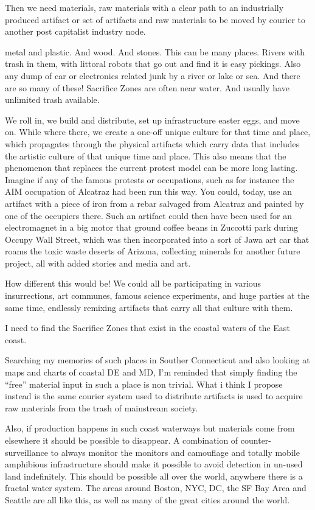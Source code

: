 Then we need materials, raw materials with a clear path to an
industrially produced artifact or set of artifacts and raw materials to
be moved by courier to another post capitalist industry node.

metal and plastic. And wood. And stones. This can be many places. Rivers
with trash in them, with littoral robots that go out and find it is easy
pickings. Also any dump of car or electronics related junk by a river or
lake or sea. And there are so many of these! Sacrifice Zones are often
near water. And usually have unlimited trash available.

We roll in, we build and distribute, set up infrastructure easter eggs,
and move on. While where there, we create a one-off unique culture for
that time and place, which propagates through the physical artifacts
which carry data that includes the artistic culture of that unique time
and place. This also means that the phenomenon that replaces the current
protest model can be more long lasting. Imagine if any of the famous
protests or occupations, such as for instance the AIM occupation of
Alcatraz had been run this way. You could, today, use an artifact with a
piece of iron from a rebar salvaged from Alcatraz and painted by one of
the occupiers there. Such an artifact could then have been used for an
electromagnet in a big motor that ground coffee beans in Zuccotti park
during Occupy Wall Street, which was then incorporated into a sort of
Jawa art car that roams the toxic waste deserts of Arizona, collecting
minerals for another future project, all with added stories and media
and art.

How different this would be! We could all be participating in various
insurrections, art communes, famous science experiments, and huge
parties at the same time, endlessly remixing artifacts that carry all
that culture with them.

I need to find the Sacrifice Zones that exist in the coastal waters of
the East coast.

Searching my memories of such places in Souther Connecticut and also
looking at maps and charts of coastal DE and MD, I'm reminded that
simply finding the ``free'' material input in such a place is non
trivial. What i think I propose instead is the same courier system used
to distribute artifacts is used to acquire raw materials from the trash
of mainstream society.

Also, if production happens in such coast waterways but materials come
from elsewhere it should be possible to disappear. A combination of
counter-surveillance to always monitor the monitors and camouflage and
totally mobile amphibious infrastructure should make it possible to
avoid detection in un-used land indefinitely. This should be possible
all over the world, anywhere there is a fractal water system. The areas
around Boston, NYC, DC, the SF Bay Area and Seattle are all like this,
as well as many of the great cities around the world.

